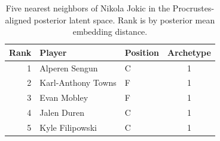 \begin{table}[htbp]
  \centering\small
  \begin{tabular}{rllc}
    \toprule
    Rank & Player & Position & Archetype \\
    \midrule
    1 & Alperen Sengun & C & 1 \\
    2 & Karl-Anthony Towns & F & 1 \\
    3 & Evan Mobley & F & 1 \\
    4 & Jalen Duren & C & 1 \\
    5 & Kyle Filipowski & C & 1 \\
    \bottomrule
  \end{tabular}
  \caption{Five nearest neighbors of Nikola Jokic in the Procrustes-aligned posterior latent space. Rank is by posterior mean embedding distance.}
  \label{tab:Nikola_Jokic_neighbors}
\end{table}

